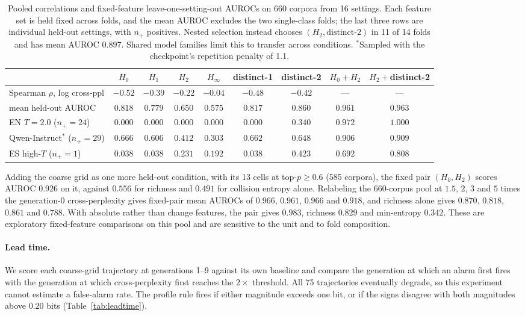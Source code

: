 \documentclass[10pt]{article}
\theoremstyle{plain}
\theoremstyle{definition}
\newcommand{\Htwo}{H_2}
\newcommand{\Hz}{H_0}
\newcommand{\Hinf}{H_\infty}
\begin{document}
\begin{table}[ht]
\centering\small
\caption{Pooled correlations and fixed-feature leave-one-setting-out AUROCs on 660 corpora from
16 settings. Each feature set is held fixed across folds, and the mean AUROC excludes the two
single-class folds; the last three rows are individual held-out settings, with $n_+$ positives. Nested selection instead chooses $(\Htwo,\text{distinct-}2)$ in 11 of 14
folds and has mean AUROC $0.897$. Shared model families limit this to
transfer across conditions. $^\ast$Sampled with the checkpoint's repetition penalty of 1.1.}
\label{tab:detect}
\setlength{\tabcolsep}{4pt}
\begin{tabular}{lcccccccc}
\toprule
 & $\Hz$ & $H_1$ & $\Htwo$ & $\Hinf$ & distinct-1 & distinct-2 & $\Hz{+}\Htwo$ & $\Htwo{+}$distinct-2 \\
\midrule
Spearman $\rho$, log cross-ppl & $-0.52$ & $-0.39$ & $-0.22$ & $-0.04$ & $-0.48$ & $-0.42$ & --- & --- \\
\midrule
mean held-out AUROC & $0.818$ & $0.779$ & $0.650$ & $0.575$ & $0.817$ & $0.860$ & $0.961$ & $0.963$ \\
\;\;EN $T{=}2.0$ ($n_{+}{=}24$) & $0.000$ & $0.000$ & $0.000$ & $0.000$ & $0.000$ & $0.340$ & $0.972$ & $1.000$ \\
\;\;Qwen-Instruct$^\ast$ ($n_{+}{=}29$) & $0.666$ & $0.606$ & $0.412$ & $0.303$ & $0.662$ & $0.648$ & $0.906$ & $0.909$ \\
\;\;ES high-$T$ ($n_{+}{=}1$) & $0.038$ & $0.038$ & $0.231$ & $0.192$ & $0.038$ & $0.423$ & $0.692$ & $0.808$ \\
\bottomrule
\end{tabular}
\end{table}

Adding the coarse grid as one more held-out condition, with its 13 cells at top-$p\ge0.6$ (585
corpora), the fixed pair $(\Hz,\Htwo)$ scores AUROC $0.926$ on it, against $0.556$ for richness
and $0.491$ for collision entropy alone. Relabeling the 660-corpus pool at $1.5$, $2$, $3$ and $5$
times the generation-0 cross-perplexity gives fixed-pair mean AUROCs of $0.966$, $0.961$, $0.966$
and $0.918$, and richness alone gives $0.870$, $0.818$, $0.861$ and $0.788$. With absolute rather
than change features, the pair gives $0.983$, richness $0.829$ and min-entropy $0.342$. These are
exploratory fixed-feature comparisons on this pool and are sensitive to the unit and to fold
composition.

\paragraph{Lead time.} We score each coarse-grid trajectory at generations 1--9 against its own
baseline and compare the generation at which an alarm first fires with the generation at which
cross-perplexity first reaches the $2\times$ threshold. All 75 trajectories eventually degrade, so
this experiment cannot estimate a false-alarm rate. The profile rule fires if either magnitude
exceeds one bit, or if the signs disagree with both magnitudes above $0.20$ bits
(Table~\ref{tab:leadtime}).
\end{document}

